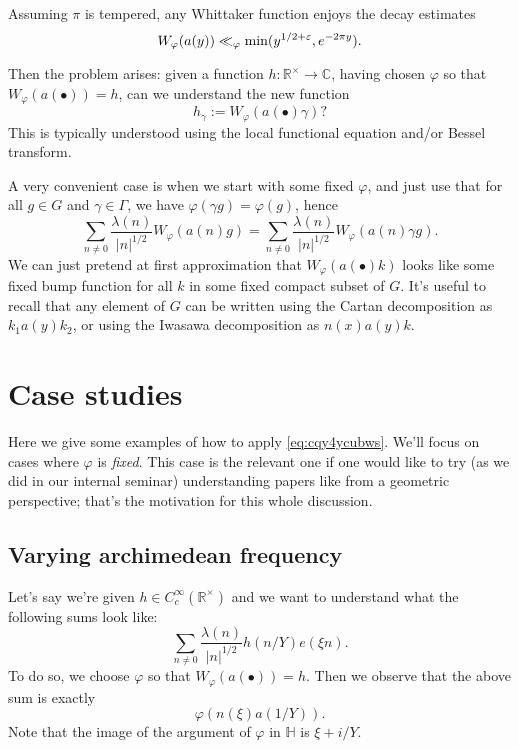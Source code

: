 \documentclass[reqno]{amsart} 
\begin{document}
\begin{remark}
  Assuming $\pi$ is tempered, any Whittaker function enjoys the decay estimates
  \begin{equation*}
    W_{\varphi}(a(y)) \ll_{\varphi} \min(y^{1/2 + \varepsilon}, e^{- 2 \pi y}).
  \end{equation*}
\end{remark}

Then the problem arises: given a function $h : \mathbb{R}^\times \rightarrow \mathbb{C}$, having chosen $\varphi$ so that $W_{\varphi}(a(\bullet)) = h$, can we understand the new function
\begin{equation*}
  h_{\gamma} := W_{\varphi}(a(\bullet) \gamma)?
\end{equation*}
This is typically understood using the local functional equation and/or Bessel transform.

A very convenient case is when we start with some fixed $\varphi$, and just use that for all $g \in G$ and $\gamma \in \Gamma$, we have $\varphi(\gamma g) = \varphi(g)$, hence
\begin{equation}\label{eq:cqy4ycubws}
  \sum_{n \neq 0} \frac{\lambda(n)}{\lvert n \rvert^{1/2}} W_\varphi(a(n) g)
  =
  \sum_{n \neq 0} \frac{\lambda(n)}{\lvert n \rvert^{1/2}} W_\varphi(a(n) \gamma g).
\end{equation}
We can just pretend at first approximation that $W_{\varphi}(a(\bullet) k)$ looks like some fixed bump function for all $k$ in some fixed compact subset of $G$.  It's useful to recall that any element of $G$ can be written using the Cartan decomposition as $k_1 a(y) k_2$, or using the Iwasawa decomposition as $n(x) a(y) k$.

\section{Case studies}

Here we give some examples of how to apply \eqref{eq:cqy4ycubws}.  We'll focus on cases where $\varphi$ is \emph{fixed}.  This case is the relevant one if one would like to try (as we did in our internal seminar) understanding papers like \cite{MR4032289} from a geometric perspective; that's the motivation for this whole discussion. 

\subsection{Varying archimedean frequency}

Let's say we're given $h \in C_c^\infty(\mathbb{R}^\times)$ and we want to understand what the following sums look like:
\begin{equation}\label{eq:cnq418zud9}
  \sum_{n \neq 0}
  \frac{\lambda(n)}{\lvert n \rvert^{1/2}}
  h(n / Y)
  e(\xi n).
\end{equation}
To do so, we choose $\varphi$ so that $W_{\varphi}(a(\bullet)) = h$.  Then we observe that the above sum is exactly
\begin{equation*}
  \varphi(n(\xi) a(1/Y)).
\end{equation*}
Note that the image of the argument of $\varphi$ in $\mathbb{H}$ is $\xi + i /Y$.
\end{document}
